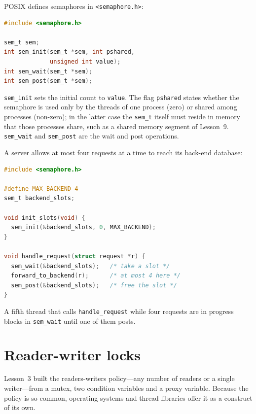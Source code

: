\documentclass[../main.tex]{subfiles}
\begin{document}
POSIX defines semaphores in \texttt{<semaphore.h>}:
\begin{lstlisting}[language=C, numbers=none]
#include <semaphore.h>

sem_t sem;
int sem_init(sem_t *sem, int pshared,
             unsigned int value);
int sem_wait(sem_t *sem);
int sem_post(sem_t *sem);
\end{lstlisting}
\texttt{sem\_init} sets the initial count to \texttt{value}.  The flag
\texttt{pshared} states whether the semaphore is used only by the threads of
one process (zero) or shared among processes (non-zero); in the latter case
the \texttt{sem\_t} itself must reside in memory that those processes share,
such as a shared memory segment of Lesson~9.  \texttt{sem\_wait} and
\texttt{sem\_post} are the wait and post operations.%

\begin{example}
  A server allows at most four requests at a time to reach its back-end
  database:
  \begin{lstlisting}[language=C, numbers=none]
#include <semaphore.h>

#define MAX_BACKEND 4
sem_t backend_slots;

void init_slots(void) {
  sem_init(&backend_slots, 0, MAX_BACKEND);
}

void handle_request(struct request *r) {
  sem_wait(&backend_slots);   /* take a slot */
  forward_to_backend(r);      /* at most 4 here */
  sem_post(&backend_slots);   /* free the slot */
}
\end{lstlisting}
  A fifth thread that calls \texttt{handle\_request} while four requests
  are in progress blocks in \texttt{sem\_wait} until one of them
  posts.
\end{example}

\section{Reader-writer locks}
\label{sec:l10-rwlock}

Lesson~3 built the readers-writers policy---any number of readers or a
single writer---from a mutex, two condition variables and a proxy
variable.  Because the policy is so common, operating systems and
thread libraries offer it as a construct of its own.
\end{document}
